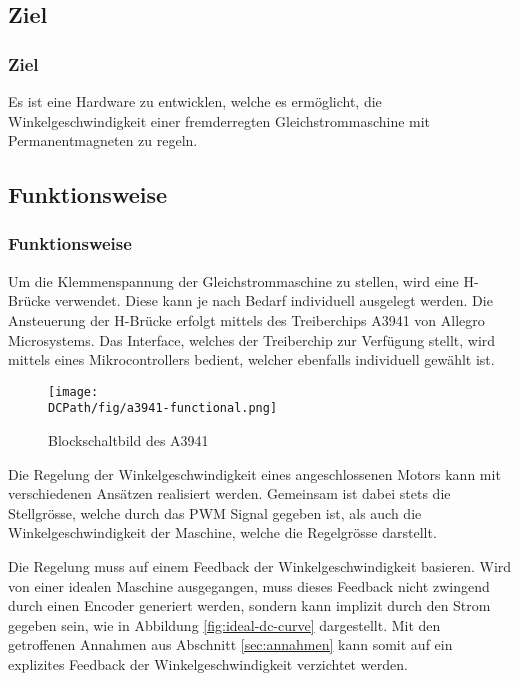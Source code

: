 \ifSTANDALONE
\subsection{Ziel}
\fi
\ifEMBED
\subsubsection{Ziel}
\fi
Es ist eine Hardware zu entwicklen, welche es ermöglicht, die
Winkelgeschwindigkeit einer fremderregten Gleichstrommaschine mit
Permanentmagneten zu regeln.

\ifSTANDALONE
\subsection{Funktionsweise}
\fi
\ifEMBED
\subsubsection{Funktionsweise}
\fi
Um die Klemmenspannung der Gleichstrommaschine zu stellen, wird eine
H-Brücke verwendet. Diese kann je nach Bedarf individuell ausgelegt
werden. Die Ansteuerung der H-Brücke erfolgt mittels des Treiberchips
A3941 von Allegro Microsystems. Das Interface, welches der
Treiberchip zur Verfügung stellt, wird mittels eines Mikrocontrollers
bedient, welcher ebenfalls individuell gewählt ist.

\begin{figure}[h!]
    \centering
    \texttt{[image: \\DCPath/fig/a3941-functional.png]}
    \caption[Blockschaltbild des A3941]{Blockschaltbild des A3941 \cite{Datasheet:A3941}}
    \label{fig:a3941-functional}
\end{figure}

\noindent Die Regelung der Winkelgeschwindigkeit eines angeschlossenen Motors 
kann mit verschiedenen Ansätzen realisiert werden. Gemeinsam ist dabei stets die
Stellgrösse, welche durch das PWM Signal gegeben ist, als auch die
Winkelgeschwindigkeit der Maschine, welche die Regelgrösse darstellt.

\noindent Die Regelung muss auf einem Feedback der Winkelgeschwindigkeit 
basieren. Wird von einer idealen Maschine ausgegangen, muss dieses Feedback 
nicht zwingend durch einen Encoder generiert werden, sondern kann implizit 
durch den Strom gegeben sein, wie in Abbildung \ref{fig:ideal-dc-curve} 
dargestellt. Mit den getroffenen Annahmen aus Abschnitt \ref{sec:annahmen} 
kann somit auf ein explizites Feedback der Winkelgeschwindigkeit verzichtet 
werden. 

